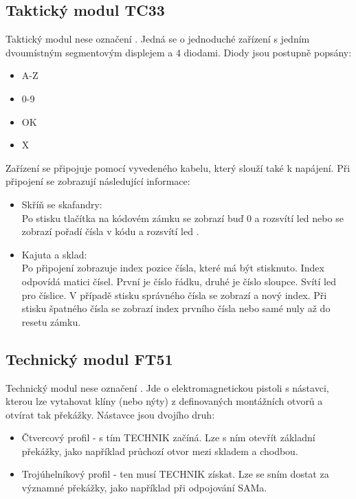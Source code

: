 \documentclass[11pt,oneside,a4paper]{article}
\begin{document}
\subsection{\texorpdfstring{Taktický modul TC33}{Taktický modul TC33}}
\label{subsec:TC33}
Taktický modul nese označení . Jedná se o jednoduché zařízení s jedním dvoumístným segmentovým displejem a 4 diodami. Diody jsou postupně popsány:
\begin{itemize}
\item A-Z
\item 0-9
\item OK
\item X
\end{itemize}
Zařízení se připojuje pomocí vyvedeného kabelu, který slouží také k napájení. Při připojení se zobrazují následující informace:
\begin{itemize}
\item Skříň se skafandry:\\
Po stisku tlačítka na kódovém zámku se zobrazí buď 0 a rozsvítí led  nebo se zobrazí pořadí čísla v kódu a rozsvítí led .
\item Kajuta a sklad: \\
Po připojení zobrazuje index pozice čísla, které má být stisknuto. Index odpovídá matici čísel. První je číslo řádku, druhé je číslo sloupce. Svítí led pro číslice. V případě stisku správného čísla se zobrazí  a nový index. Při stisku špatného čísla se zobrazí index prvního čísla nebo samé nuly až do resetu zámku.
\end{itemize}

\subsection{\texorpdfstring{Technický modul FT51}{Technický modul FT51}}
\label{subsec:FM51}
Technický modul nese označení . Jde o elektromagnetickou pistoli s nástavci, kterou lze vytahovat klíny (nebo nýty) z definovaných montážních otvorů a otvírat tak překážky. Nástavce jsou dvojího druh:
\begin{itemize}
\item Čtvercový profil - s tím TECHNIK začíná. Lze s ním otevřít základní překážky, jako například průchozí otvor mezi skladem a chodbou.
\item Trojúhelníkový profil - ten musí TECHNIK získat. Lze se sním dostat za významné překážky, jako například při odpojování SAMa.
\end{itemize}
\end{document}
